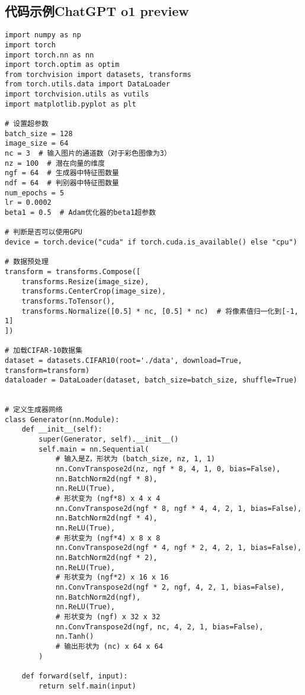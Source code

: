 \subsection*{代码示例ChatGPT o1 preview}
\begin{lstlisting}
import numpy as np
import torch
import torch.nn as nn
import torch.optim as optim
from torchvision import datasets, transforms
from torch.utils.data import DataLoader
import torchvision.utils as vutils
import matplotlib.pyplot as plt

# 设置超参数
batch_size = 128
image_size = 64
nc = 3  # 输入图片的通道数（对于彩色图像为3）
nz = 100  # 潜在向量的维度
ngf = 64  # 生成器中特征图数量
ndf = 64  # 判别器中特征图数量
num_epochs = 5
lr = 0.0002
beta1 = 0.5  # Adam优化器的beta1超参数

# 判断是否可以使用GPU
device = torch.device("cuda" if torch.cuda.is_available() else "cpu")

# 数据预处理
transform = transforms.Compose([
    transforms.Resize(image_size),
    transforms.CenterCrop(image_size),
    transforms.ToTensor(),
    transforms.Normalize([0.5] * nc, [0.5] * nc)  # 将像素值归一化到[-1, 1]
])

# 加载CIFAR-10数据集
dataset = datasets.CIFAR10(root='./data', download=True, transform=transform)
dataloader = DataLoader(dataset, batch_size=batch_size, shuffle=True)


# 定义生成器网络
class Generator(nn.Module):
    def __init__(self):
        super(Generator, self).__init__()
        self.main = nn.Sequential(
            # 输入是Z，形状为 (batch_size, nz, 1, 1)
            nn.ConvTranspose2d(nz, ngf * 8, 4, 1, 0, bias=False),
            nn.BatchNorm2d(ngf * 8),
            nn.ReLU(True),
            # 形状变为 (ngf*8) x 4 x 4
            nn.ConvTranspose2d(ngf * 8, ngf * 4, 4, 2, 1, bias=False),
            nn.BatchNorm2d(ngf * 4),
            nn.ReLU(True),
            # 形状变为 (ngf*4) x 8 x 8
            nn.ConvTranspose2d(ngf * 4, ngf * 2, 4, 2, 1, bias=False),
            nn.BatchNorm2d(ngf * 2),
            nn.ReLU(True),
            # 形状变为 (ngf*2) x 16 x 16
            nn.ConvTranspose2d(ngf * 2, ngf, 4, 2, 1, bias=False),
            nn.BatchNorm2d(ngf),
            nn.ReLU(True),
            # 形状变为 (ngf) x 32 x 32
            nn.ConvTranspose2d(ngf, nc, 4, 2, 1, bias=False),
            nn.Tanh()
            # 输出形状为 (nc) x 64 x 64
        )

    def forward(self, input):
        return self.main(input)



\end{lstlisting}
